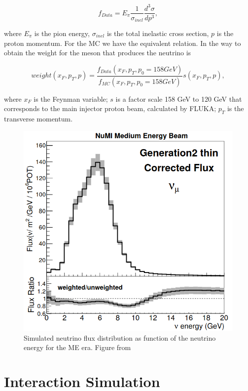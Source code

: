 \begin{equation}
    f_{Data}=E_\pi\frac{1}{\sigma_{inel}}\frac{d^3\sigma}{dp^3},
\end{equation}

where $E_\pi$ is the pion energy, $\sigma_{inel}$ is the total inelastic cross section, $p$ is the proton momentum. For the MC we have the equivalent relation. In the way to obtain the weight for the meson that produces the neutrino is 

\begin{equation}
    weight(x_F,p_T,p) = \frac{f_{Data}(x_F,p_T,p_0=158 GeV)}{f_{MC}(x_F,p_T,p_0=158 GeV)}s(x_F,p_T,p),
\end{equation}

where $x_F$ is the Feynman variable; $s$ is a factor scale 158 GeV to 120 GeV that corresponds to the main injector proton beam, calculated by FLUKA\cite{Fluka}; $p_T$ is the transverse momentum. 

 
\begin{figure}
    \centering
    \includegraphics[scale=0.3]{Figures/Chapter3/FluxDistribution.png}
    \caption{Simulated neutrino flux distribution as function of the neutrino energy for the ME era. Figure from \cite{LeoThesis}}
    \label{fig:Simulation:Beam:FluxDistribution}
\end{figure}

\section{Interaction Simulation}
\label{Cap:Simulation:InteractionSimulation}


